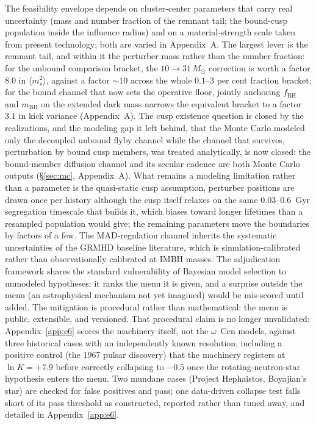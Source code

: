 \documentclass[11pt]{article}
\newcommand{\msun}{\ensuremath{M_\odot}}
\newcommand{\ocen}{\ensuremath{\omega}~Cen}
\newcommand{\lnK}{\ensuremath{\ln K}}
\begin{document}
The feasibility envelope depends on cluster-center parameters that carry real uncertainty (mass and number fraction of the remnant tail; the bound-cusp population inside the influence radius) and on a material-strength scale taken from present technology; both are varied in Appendix~A. The largest lever is the remnant tail, and within it the perturber mass rather than the number fraction: for the unbound comparison bracket, the $10 \to 31\,\msun$ correction is worth a factor $8.0$ in $\langle m_{\star}^{2}\rangle$, against a factor $\sim 10$ across the whole $0.1$--$3$ per cent fraction bracket; for the bound channel that now sets the operative floor, jointly anchoring $f_{\mathrm{BH}}$ and $m_{\mathrm{BH}}$ on the extended dark mass narrows the equivalent bracket to a factor $3.1$ in kick variance (Appendix~A). The cusp existence question is closed by the \citet{GonzalezPrieto2025} realizations, and the modeling gap it left behind, that the Monte Carlo modeled only the decoupled unbound flyby channel while the channel that survives, perturbation by bound cusp members, was treated analytically, is now closed: the bound-member diffusion channel and its secular cadence are both Monte Carlo outputs (\S\ref{sec:mc}, Appendix~A). What remains a modeling limitation rather than a parameter is the quasi-static cusp assumption, perturber positions are drawn once per history although the cusp itself relaxes on the same $0.03$--$0.6$~Gyr segregation timescale that builds it, which biases toward longer lifetimes than a resampled population would give; the remaining parameters move the boundaries by factors of a few. The MAD-regulation channel inherits the systematic uncertainties of the GRMHD baseline literature, which is simulation-calibrated rather than observationally calibrated at IMBH masses. The adjudication framework shares the standard vulnerability of Bayesian model selection to unmodeled hypotheses: it ranks the menu it is given, and a surprise outside the menu (an astrophysical mechanism not yet imagined) would be mis-scored until added. The mitigation is procedural rather than mathematical: the menu is public, extensible, and versioned. That procedural claim is no longer unvalidated: Appendix~\ref{app:e6} scores the machinery itself, not the \ocen{} models, against three historical cases with an independently known resolution, including a positive control (the 1967 pulsar discovery) that the machinery registers at $\lnK = +7.9$ before correctly collapsing to $-0.5$ once the rotating-neutron-star hypothesis enters the menu. Two mundane cases (Project Hephaistos, Boyajian's star) are checked for false positives and pass; one data-driven collapse test falls short of its pass threshold as constructed, reported rather than tuned away, and detailed in Appendix~\ref{app:e6}.
\end{document}
